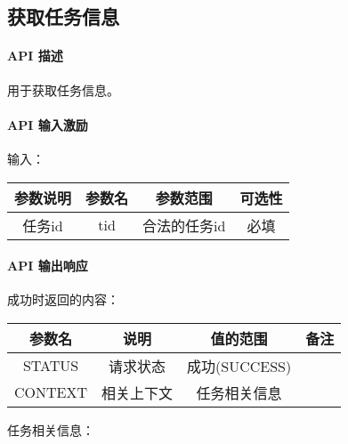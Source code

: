 \documentclass[UTF8]{dingo}
\def\apiintr{\paragraph{\colorbox[rgb]{1.0,0.6,0.65}{API 描述}}} %
\def\apiexc{\paragraph{\colorbox[rgb]{1,0.85,0.45}{API 输入激励}}} %
\def\apiresp{\paragraph{\colorbox[rgb]{0.9,0.9,1}{API 输出响应}}} %
\def\成功{\colorbox[rgb]{0.4,1,0.5}{成功}}
\def\成功V{成功(SUCCESS)}
\begin{document}
    \subsection{获取任务信息}
    \apiintr
    用于获取任务信息。
    \apiexc
    输入：\\
    \begin{tabular}{|c|c|c|c|}
        \hline \rule[-2ex]{0pt}{5.5ex} 参数说明 & 参数名 & 参数范围 & 可选性 \\
        \hline \rule[-2ex]{0pt}{5.5ex} 任务id & tid & 合法的任务id & 必填 \\
        \hline
    \end{tabular}
    \apiresp
    \成功 时返回的内容：\\
    \begin{tabular}{|c|c|c|c|}
        \hline \rule[-2ex]{0pt}{5.5ex} 参数名 & 说明 & 值的范围 & 备注 \\
        \hline \rule[-2ex]{0pt}{5.5ex} STATUS & 请求状态 & \成功V &  \\
        \hline \rule[-2ex]{0pt}{5.5ex} CONTEXT & 相关上下文 & 任务相关信息 &  \\
        \hline
    \end{tabular}
    \par 任务相关信息： \\
\end{document}
